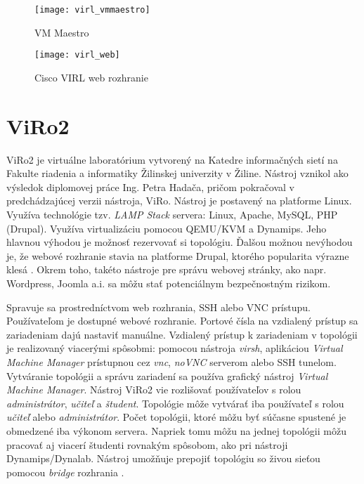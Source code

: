\begin{figure}
    \centering
    \texttt{[image: virl\_vmmaestro]}
    \caption{VM Maestro} \cite{obr_virl_vmmaestro}
    \label{obr:virl_vmmaestro}

    \vspace{4cm}

    \centering
    \texttt{[image: virl\_web]}
    \caption{Cisco VIRL web rozhranie} \cite{obr_virl_web}
    \label{obr:virl_web}
\end{figure}





\section{ViRo2}

ViRo2 je virtuálne laboratórium vytvorený na Katedre informačných sietí na Fakulte riadenia a informatiky Žilinskej univerzity v Žiline. Nástroj vznikol ako výsledok diplomovej práce Ing. Petra Hadača, pričom pokračoval v predchádzajúcej verzii nástroja, ViRo. Nástroj je postavený na platforme Linux. Využíva technológie tzv. \emph{LAMP Stack} servera: Linux, Apache, MySQL, PHP (Drupal). Využíva virtualizáciu pomocou QEMU/KVM a Dynamips. Jeho hlavnou výhodou je možnosť rezervovať si topológiu. Ďalšou možnou nevýhodou je, že webové rozhranie stavia na platforme Drupal, ktorého popularita výrazne klesá \cite{stackoverflow_survey}. Okrem toho, takéto nástroje pre správu webovej stránky, ako napr. Wordpress, Joomla a.i. sa môžu stať potenciálnym bezpečnostným rizikom. \cite{incapsula_cms}

Spravuje sa prostredníctvom web rozhrania, SSH alebo VNC prístupu. Používateľom je dostupné webové rozhranie. Portové čísla na vzdialený prístup sa zariadeniam dajú nastaviť manuálne. Vzdialený prístup k zariadeniam v topológii je realizovaný viacerými spôsobmi: pomocou nástroja \emph{virsh}, aplikáciou \emph{Virtual Machine Manager} prístupnou cez \emph{vnc}, \emph{noVNC} serverom alebo SSH tunelom. Vytváranie topológii a správu zariadení sa používa grafický nástroj \emph{Virtual Machine Manager}. Nástroj ViRo2 vie rozlišovať používateľov s rolou \emph{administrátor}, \emph{učiteľ} a \emph{študent}. Topológie môže vytvárať iba používateľ s rolou \emph{učiteľ} alebo \emph{administrátor}. Počet topológii, ktoré môžu byť súčasne spustené je obmedzené iba výkonom servera. Napriek tomu môžu na jednej topológii môžu pracovať aj viacerí študenti rovnakým spôsobom, ako pri nástroji Dynamips/Dynalab. Nástroj umožňuje prepojiť topológiu so živou sieťou pomocou \emph{bridge} rozhrania \cite{viro_hadac}.





